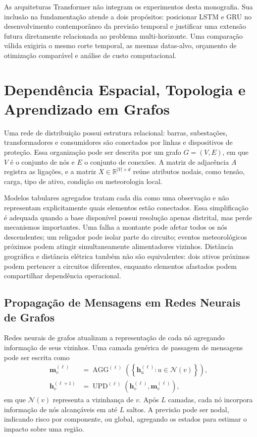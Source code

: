 As arquiteturas Transformer não integram os experimentos desta monografia. Sua inclusão na fundamentação atende a dois propósitos: posicionar LSTM e GRU no desenvolvimento contemporâneo da previsão temporal e justificar uma extensão futura diretamente relacionada ao problema multi-horizonte. Uma comparação válida exigiria o mesmo corte temporal, as mesmas datas-alvo, orçamento de otimização comparável e análise de custo computacional.

\section{Dependência Espacial, Topologia e Aprendizado em Grafos}\label{sec:grafos_rede}

Uma rede de distribuição possui estrutura relacional: barras, subestações, transformadores e consumidores são conectados por linhas e dispositivos de proteção. Essa organização pode ser descrita por um grafo $G=(V,E)$, em que $V$ é o conjunto de nós e $E$ o conjunto de conexões. A matriz de adjacência $A$ registra as ligações, e a matriz $X\in\mathbb{R}^{|V|\times d}$ reúne atributos nodais, como tensão, carga, tipo de ativo, condição ou meteorologia local.

Modelos tabulares agregados tratam cada dia como uma observação e não representam explicitamente quais elementos estão conectados. Essa simplificação é adequada quando a base disponível possui resolução apenas distrital, mas perde mecanismos importantes. Uma falha a montante pode afetar todos os nós descendentes; um religador pode isolar parte do circuito; eventos meteorológicos próximos podem atingir simultaneamente alimentadores vizinhos. Distância geográfica e distância elétrica também não são equivalentes: dois ativos próximos podem pertencer a circuitos diferentes, enquanto elementos afastados podem compartilhar dependência operacional.

\subsection{Propagação de Mensagens em Redes Neurais de Grafos}

Redes neurais de grafos atualizam a representação de cada nó agregando informação de seus vizinhos. Uma camada genérica de passagem de mensagens pode ser escrita como
\begin{align}
    \mathbf{m}_v^{(\ell)}
    &=\operatorname{AGG}^{(\ell)}
    \left(\left\{\mathbf{h}_u^{(\ell)}:u\in\mathcal{N}(v)\right\}\right),\\
    \mathbf{h}_v^{(\ell+1)}
    &=\operatorname{UPD}^{(\ell)}
    \left(\mathbf{h}_v^{(\ell)},\mathbf{m}_v^{(\ell)}\right),
    \label{eq:message_passing}
\end{align}
em que $\mathcal{N}(v)$ representa a vizinhança de $v$. Após $L$ camadas, cada nó incorpora informação de nós alcançáveis em até $L$ saltos. A previsão pode ser nodal, indicando risco por componente, ou global, agregando os estados para estimar o impacto sobre uma região.

